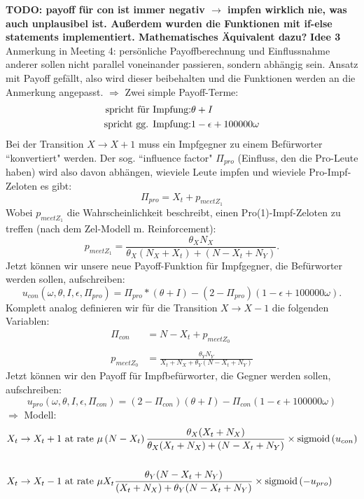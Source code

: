 \documentclass[10pt,a4paper]{article}
\begin{document}
\textbf{TODO: payoff für con ist immer negativ $\rightarrow$ impfen wirklich nie, was auch unplausibel ist. Außerdem wurden die Funktionen mit if-else statements implementiert. Mathematisches Äquivalent dazu?}
\newpage
\textbf{Idee 3}\newline
Anmerkung in Meeting 4: persönliche Payoffberechnung und Einflussnahme anderer sollen nicht parallel voneinander passieren, sondern abhängig sein. Ansatz mit Payoff gefällt, also wird dieser beibehalten und die Funktionen werden an die Anmerkung angepasst.\newline
$\Rightarrow$ Zwei simple Payoff-Terme:
\begin{align*}
	\textnormal{spricht für Impfung:}& \theta + I\\
	\textnormal{spricht gg. Impfung:}& 1-\epsilon + 100000\omega
\end{align*}
Bei der Transition $X \rightarrow X + 1$ muss ein Impfgegner zu einem Befürworter ``konvertiert" werden. Der sog. ``influence factor" $\Pi_{pro}$ (Einfluss, den die Pro-Leute haben) wird also davon abhängen, wieviele Leute impfen und wieviele Pro-Impf-Zeloten es gibt:
\begin{equation}
	\Pi_{pro} = X_t + p_{meet Z_1}
\end{equation}
Wobei $p_{meet Z_1}$ die Wahrscheinlichkeit beschreibt, einen Pro(1)-Impf-Zeloten zu treffen (nach dem Zel-Modell m. Reinforcement):
\begin{equation}
	p_{meet Z_1} = \frac{\theta_X N_X}{\theta_X(N_X + X_t) + (N-X_t + N_Y)}.
\end{equation}
Jetzt können wir unsere neue Payoff-Funktion für Impfgegner, die Befürworter werden sollen, aufschreiben:
\begin{equation}
	u_{con}\left(\omega, \theta, I, \epsilon, \Pi_{pro}\right) = \Pi_{pro} * (\theta + I) - (2 -\Pi_{pro})(1-\epsilon + 100000\omega).
\end{equation}
Komplett analog definieren wir für die Transition $X \rightarrow X-1$ die folgenden Variablen:
\begin{align*}
	\Pi_{con} &= N-X_t + p_{meet Z_0}\\
	&\\
	p_{meet Z_0} &= \frac{\theta_Y N_Y}{X_t + N_X + \theta_Y(N-X_t+N_Y)}
\end{align*}
Jetzt können wir den Payoff für Impfbefürworter, die Gegner werden sollen, aufschreiben:
\begin{equation}
	u_{pro}\left(\omega, \theta, I, \epsilon, \Pi_{con}\right) = (2-\Pi_{con})(\theta + I) - \Pi_{con} (1-\epsilon+100000\omega)
\end{equation}
$\Rightarrow$ Modell:
\begin{align*}
\begin{split}
X_t \rightarrow X_t + 1 & \textnormal{ at rate } \mu\left(N-X_t\right)\frac{\theta_X (X_t + N_X)}{\theta_X (X_t + N_X) + (N - X_t + N_Y)} \times \mathrm{sigmoid}\left(u_{con}\right) \\
&\\
X_t \rightarrow X_t - 1 & \textnormal{ at rate } \mu X_t\frac{\theta_Y(N-X_t+N_Y)}{(X_t + N_X) + \theta_Y(N-X_t+N_Y)} \times \mathrm{sigmoid}\left(- u_{pro}\right)
\end{split}
\end{align*}
\end{document}
